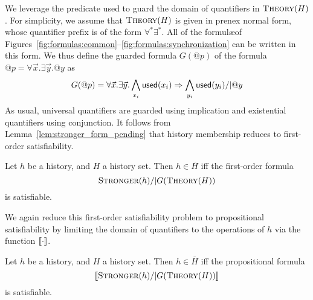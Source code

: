 We leverage the predicate {\sf used} to guard the domain of quantifiers in
$\textsc{Theory}(H)$. For simplicity, we assume that $\textsc{Theory}(H)$ is
given in prenex normal form, whose quantifier prefix is of the form $\forall^*
\exists^*$. All of the formul\ae of
Figures~\ref{fig:formulas:common}--\ref{fig:formulas:synchronization} can be
written in this form. We thus define the guarded formula $G(@p)$ of the formula
$@p = \forall \vec{x}. \exists \vec{y}. @y$ as
\begin{align*}
  G(@p) = \forall \vec{x}. \exists \vec{y}.
  \bigwedge_{x_i} {\sf used}(x_i) => 
  \bigwedge_{y_i} {\sf used}(y_i) /| @y
\end{align*}
As usual, universal quantifiers are guarded using implication and existential
quantifiers using conjunction. It follows from
Lemma~\ref{lem:stronger_form_pending} that history membership reduces to
first-order satisfiability.

\begin{theorem}
  \label{th:satisfiability_complete}

  Let $h$ be a history, and $H$ a history set. Then $h \in \overline{H}$ if{f}
  the first-order formula
  $$\textsc{Stronger}(h) /| G(\textsc{Theory}(H))$$
  is satisfiable.

\end{theorem}

We again reduce this first-order satisfiability problem to propositional
satisfiability by limiting the domain of quantifiers to the operations of $h$
via the function $[\![{\cdot}]\!]$.

\begin{corollary}
  \label{cor:satisfiability_pending}

  Let $h$ be a history, and $H$ a history set. Then $h \in \overline{H}$ if{f}
  the propositional formula
  $$[\![{\textsc{Stronger}(h) /| G(\textsc{Theory}(H))}]\!]$$
  is satisfiable.

\end{corollary}

